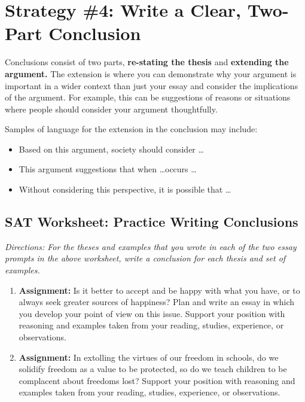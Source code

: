 \section{Strategy \#4: Write a Clear, Two-Part Conclusion}

Conclusions consist of two parts, \textbf{re-stating the thesis} and \textbf{extending the argument.} The extension
is where you can demonstrate why your argument is important in a wider context than just your essay and consider the implications of the argument. For example, this can be suggestions of reasons or situations where people should consider your argument thoughtfully.

\bigskip
Samples of language for the extension in the conclusion may include:

\begin{itemize}
\item Based on this argument, society should consider \ldots
\item This argument suggestions that when \ldots occurs \ldots
\item Without considering this perspective, it is possible that \ldots
\end{itemize}


\subsection{SAT Worksheet: Practice Writing Conclusions}
\textit{Directions: For the theses and examples that you wrote in each of the two essay prompts in the
above worksheet, write a conclusion for each thesis and set of examples.}

\begin{enumerate}
\item \textbf{Assignment:} Is it better to accept and be happy with what you have, or to always seek greater sources of happiness? Plan and write an essay in which you develop your point of view on this issue. Support your position with reasoning and examples taken from your reading, studies, experience, or observations.

\vfill\item \textbf{Assignment:} In extolling the virtues of our freedom in schools, do we solidify freedom as a value to be protected, so do we teach children to be complacent about freedoms lost? Support your position with reasoning and examples taken from your reading, studies, experience, or observations.
\vfill
\end{enumerate}

